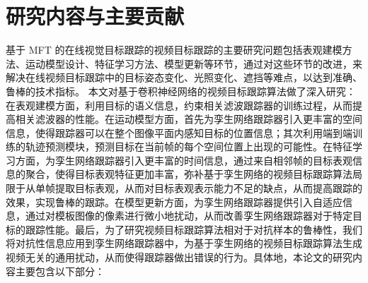 \section{研究内容与主要贡献}
基于 MFT 的在线视觉目标跟踪的视频目标跟踪的主要研究问题包括表观建模方法、运动模型设计、特征学习方法、模型更新等环节，通过对这些环节的改进，来解决在线视频目标跟踪中的目标姿态变化、光照变化、遮挡等难点，以达到准确、鲁棒的技术指标。
本文对基于卷积神经网络的视频目标跟踪算法做了深入研究：在表观建模方面，利用目标的语义信息，约束相关滤波跟踪器的训练过程，从而提高相关滤波器的性能。在运动模型方面，首先为孪生网络跟踪器引入更丰富的空间信息，使得跟踪器可以在整个图像平面内感知目标的位置信息；其次利用端到端训练的轨迹预测模块，预测目标在当前帧的每个空间位置上出现的可能性。在特征学习方面，为孪生网络跟踪器引入更丰富的时间信息，通过来自相邻帧的目标表观信息的聚合，使得目标表观特征更加丰富，弥补基于孪生网络的视频目标跟踪算法局限于从单帧提取目标表观，从而对目标表观表示能力不足的缺点，从而提高跟踪的效果，实现鲁棒的跟踪。在模型更新方面，为孪生网络跟踪器提供引入自适应信息，通过对模板图像的像素进行微小地扰动，从而改善孪生网络跟踪器对于特定目标的跟踪性能。最后，为了研究视频目标跟踪算法相对于对抗样本的鲁棒性，我们将对抗性信息应用到孪生网络跟踪器中，为基于孪生网络的视频目标跟踪算法生成视频无关的通用扰动，从而使得跟踪器做出错误的行为。具体地，本论文的研究内容主要包含以下部分：
